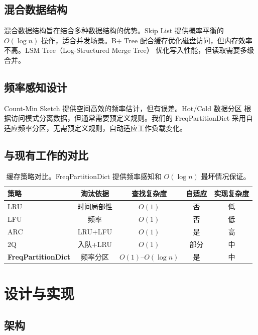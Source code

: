 \documentclass[11pt,a4paper]{article}
\begin{document}
\subsection{混合数据结构}

混合数据结构旨在结合多种数据结构的优势。Skip List \cite{pugh1990} 提供概率平衡的 $O(\log n)$ 操作，适合并发场景。B+ Tree 配合缓存优化磁盘访问，但内存效率不高。LSM Tree（Log-Structured Merge Tree）\cite{oneil1996} 优化写入性能，但读取需要多级合并。

\subsection{频率感知设计}

Count-Min Sketch \cite{cormode2005} 提供空间高效的频率估计，但有误差。Hot/Cold 数据分区 \cite{graefe2010} 根据访问模式分离数据，但通常需要预定义规则。我们的 FreqPartitionDict 采用自适应频率分区，无需预定义规则，自动适应工作负载变化。

\subsection{与现有工作的对比}

\begin{table}[H]
\centering
\caption{缓存策略对比。FreqPartitionDict 提供频率感知和 $O(\log n)$ 最坏情况保证。}
\label{tab:comparison}
\begin{tabular}{lcccc}
\toprule
\textbf{策略} & \textbf{淘汰依据} & \textbf{查找复杂度} & \textbf{自适应} & \textbf{实现复杂度} \\
\midrule
LRU & 时间局部性 & $O(1)$ & 否 & 低 \\
LFU & 频率 & $O(1)$ & 否 & 低 \\
ARC & LRU+LFU & $O(1)$ & 是 & 高 \\
2Q & 入队+LRU & $O(1)$ & 部分 & 中 \\
\textbf{FreqPartitionDict} & 频率分区 & $O(1)$--$O(\log n)$ & 是 & 中 \\
\bottomrule
\end{tabular}
\end{table}

\section{设计与实现}

\subsection{架构}
\end{document}
